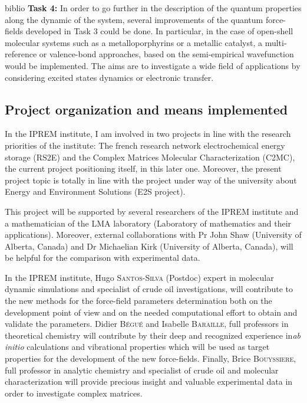 \documentclass[11pt]{artuppax}
\newcounter{subsec}[section]
\begin{document}
\begin{btSect}{biblio}
\textbf{Task 4:}
In order to go further in the description of the quantum properties along the dynamic of the system, several improvements of the quantum force-fields developed in Task 3 could be done. In particular, in the case of open-shell molecular systems such as a metalloporphyrins or a metallic catalyst, a multi-reference or valence-bond approaches, based on the semi-empirical wavefunction would be implemented. The aims are to investigate a wide field of applications by considering excited states dynamics or electronic transfer.

\subsection{Project organization and means implemented}

In the IPREM institute, I am involved in two projects in line with the research priorities of the institute: The french research network electrochemical energy storage (RS2E) and the Complex Matrices Molecular Characterization (C2MC), the current project positioning itself, in this later one. Moreover, the present project topic is totally in line with the project under way of the university about Energy and Environment Solutions (E2S project).

This project will be supported by several researchers of the IPREM institute and a mathematician of the LMA laboratory (Laboratory of mathematics and their applications). Moreover, external collaborations with Pr John Shaw (University of Alberta, Canada) and Dr Michaelian Kirk (University of Alberta, Canada), will be helpful for the comparison with experimental data.

In the IPREM institute, Hugo \textsc{Santos-Silva} (Postdoc) expert in molecular dynamic simulations and specialist of crude oil investigations, will contribute to the new methods for the force-field parameters determination both on the development point of view and on the needed computational effort to obtain and validate the parameters. Didier \textsc{Bégué} and Isabelle \textsc{Baraille}, full professors in theoretical chemistry will contribute by their deep and recognized experience in\textit{ab initio} calculations and vibrational properties which will be used as target properties for the development of the new force-fields. Finally, Brice \textsc{Bouyssiere}, full professor in analytic chemistry and specialist of crude oil and molecular characterization will provide precious insight and valuable experimental data in order to investigate complex matrices.


\end{btSect}
\end{document}
